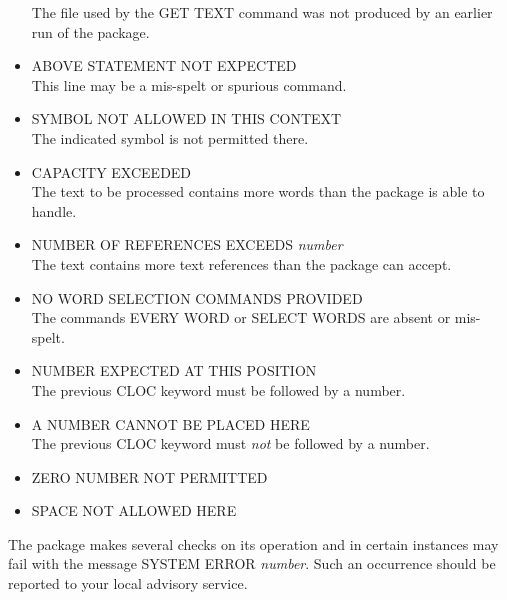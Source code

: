\begin{itemize}
                 The file used by the GET TEXT command was not
                 produced by an earlier run of the package.
\item ABOVE STATEMENT NOT EXPECTED\\
                 This line may be a mis-spelt or spurious command.
\item SYMBOL NOT ALLOWED IN THIS CONTEXT\\
                 The indicated symbol is not permitted there.
\item CAPACITY EXCEEDED\\
                 The text to be processed contains more words than
                 the package is able to handle.
\item NUMBER OF REFERENCES EXCEEDS {\em number}\\
                 The text contains more text references than the
                 package can accept.
\item NO WORD SELECTION COMMANDS PROVIDED\\
                 The commands EVERY WORD or SELECT WORDS are
                 absent or mis-spelt.
\item NUMBER EXPECTED AT THIS POSITION\\
                 The previous CLOC keyword must be followed by a number.
\item A NUMBER CANNOT BE PLACED HERE\\
                 The previous CLOC keyword must {\em not} be followed by a number.
\item ZERO NUMBER NOT PERMITTED
\item SPACE NOT ALLOWED HERE
\end{itemize}

 The package makes several checks on its operation and in certain
 instances may fail with the message SYSTEM ERROR {\em number}.  Such an
 occurrence should be reported to your local advisory service.

